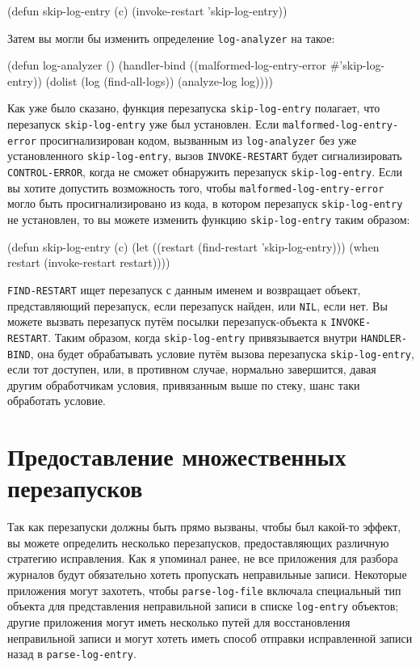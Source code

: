 \begin{myverb}
(defun skip-log-entry (c)
  (invoke-restart 'skip-log-entry))
\end{myverb}

Затем вы могли бы изменить определение \lstinline{log-analyzer} на такое:

\begin{myverb}
(defun log-analyzer ()
  (handler-bind ((malformed-log-entry-error #'skip-log-entry))
    (dolist (log (find-all-logs))
      (analyze-log log))))
\end{myverb}

Как уже было сказано, функция перезапуска \lstinline{skip-log-entry} полагает, что перезапуск
\lstinline{skip-log-entry} уже был установлен. Если \lstinline{malformed-log-entry-error}
просигнализирован кодом, вызванным из \lstinline{log-analyzer} без уже установленного
\lstinline{skip-log-entry}, вызов \lstinline{INVOKE-RESTART} будет сигнализировать
\lstinline{CONTROL-ERROR}, когда не сможет обнаружить перезапуск \lstinline{skip-log-entry}. Если вы
хотите допустить возможность того, чтобы \lstinline{malformed-log-entry-error} могло быть
просигнализировано из кода, в котором перезапуск \lstinline{skip-log-entry} не установлен, то вы
можете изменить функцию \lstinline{skip-log-entry} таким образом:

\begin{myverb}
(defun skip-log-entry (c)
  (let ((restart (find-restart 'skip-log-entry)))
    (when restart (invoke-restart restart))))
\end{myverb}

\lstinline{FIND-RESTART} ищет перезапуск с данным именем и возвращает объект, представляющий
перезапуск, если перезапуск найден, или \lstinline{NIL}, если нет. Вы можете вызвать перезапуск
путём посылки перезапуск-объекта к \lstinline{INVOKE-RESTART}. Таким образом, когда
\lstinline{skip-log-entry} привязывается внутри \lstinline{HANDLER-BIND}, она будет обрабатывать
условие путём вызова перезапуска \lstinline{skip-log-entry}, если тот доступен, или, в противном
случае, нормально завершится, давая другим обработчикам условия, привязанным выше по
стеку, шанс таки обработать условие.

\section{Предоставление множественных перезапусков}

Так как перезапуски должны быть прямо вызваны, чтобы был какой-то эффект, вы можете
определить несколько перезапусков, предоставляющих различную стратегию исправления. Как я
упоминал ранее, не все приложения для разбора журналов будут обязательно хотеть пропускать
неправильные записи. Некоторые приложения могут захотеть, чтобы \lstinline{parse-log-file}
включала специальный тип объекта для представления неправильной записи в списке
\lstinline{log-entry} объектов; другие приложения могут иметь несколько путей для
восстановления неправильной записи и могут хотеть иметь способ отправки исправленной
записи назад в \lstinline{parse-log-entry}.

